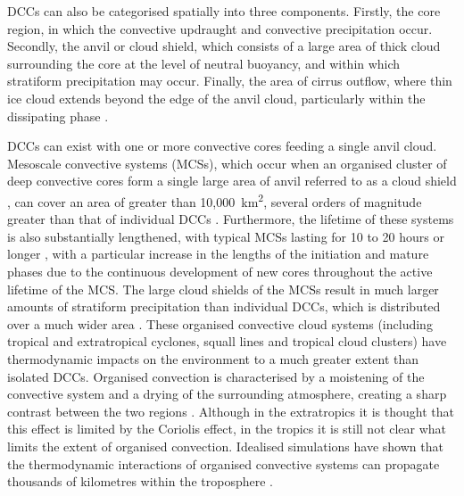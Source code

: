 DCCs can also be categorised spatially into three components.
Firstly, the core region, in which the convective updraught and convective precipitation occur.
Secondly, the anvil or cloud shield, which consists of a large area of thick cloud surrounding the core at the level of neutral buoyancy, and within which stratiform precipitation may occur.
Finally, the area of cirrus outflow, where thin ice cloud extends beyond the edge of the anvil cloud, particularly within the dissipating phase \citep{lilly_cirrus_1988}.

DCCs can exist with one or more convective cores feeding a single anvil cloud.
Mesoscale convective systems (MCSs), which occur when an organised cluster of deep convective cores form a single large area of anvil referred to as a cloud shield \citep{roca_simple_2017}, can cover an area of greater than 10,000~km\textsuperscript{2}, several orders of magnitude greater than that of individual DCCs \citep{houze_mesoscale_2004}.
Furthermore, the lifetime of these systems is also substantially lengthened, with typical MCSs lasting for 10 to 20 hours or longer \citep{chen_diurnal_1997}, with a particular increase in the lengths of the initiation and mature phases \citep{wall_life_2018} due to the continuous development of new cores throughout the active lifetime of the MCS.
The large cloud shields of the MCSs result in much larger amounts of stratiform precipitation than individual DCCs, which is distributed over a much wider area \citep{houze_chapter_2014}.
These organised convective cloud systems (including tropical and extratropical cyclones, squall lines and tropical cloud clusters) have thermodynamic impacts on the environment to a much greater extent than isolated DCCs.
Organised convection is characterised by a moistening of the convective system and a drying of the surrounding atmosphere, creating a sharp contrast between the two regions \citep{houze_chapter_2014}.
Although in the extratropics it is thought that this effect is limited by the Coriolis effect, in the tropics it is still not clear what limits the extent of organised convection.
Idealised simulations have shown that the thermodynamic interactions of organised convective systems can propagate thousands of kilometres within the troposphere \citep{beucler_budget_2019}.

